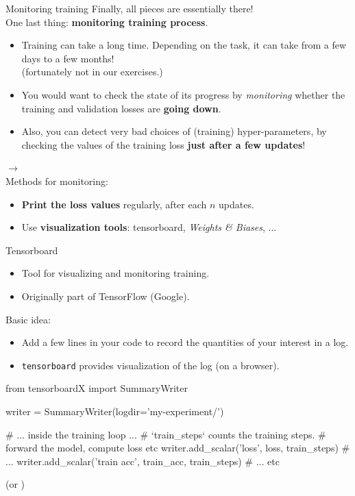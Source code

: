 \begin{frame}[fragile]{Monitoring training}
Finally, all pieces are essentially there!\\
\pause
\vsp
One last thing: \textbf{monitoring training process}.
\pause
\begin{itemize}
\item Training can take a long time. Depending on the task, it can take from a few days to a few months!\\ (fortunately not in our exercises.)
\pause
\item You would want to check the state of its progress by \textit{monitoring}
whether the training and validation losses are \textbf{going down}.
\pause
\item Also, you can detect very bad choices of (training) hyper-parameters, by checking the values of the training loss \textbf{just after a  few updates}!
\end{itemize}
$\rightarrow$ \\
\vsp
\vsp
\pause
Methods for monitoring:
\begin{itemize}
\item \textbf{Print the loss values} regularly, after each $n$ updates.
\item Use \textbf{visualization tools}: tensorboard, \textit{Weights \& Biases}, ...
\end{itemize}
\end{frame}

\begin{frame}[fragile]{Tensorboard}
\vspace{-5mm}
\begin{itemize}
\item Tool for visualizing and monitoring training.
\item Originally part of TensorFlow (Google).
\end{itemize}
\vsp
\pause
Basic idea:
\begin{itemize}
\item Add a few lines in your code to record the quantities of your interest in a log.
\item \texttt{tensorboard} provides visualization of the log (on a browser).
\end{itemize}
\pause
\begin{python}
from tensorboardX import SummaryWriter

writer = SummaryWriter(logdir='my-experiment/')

# ... inside the training loop ...
    # `train_steps` counts the training steps.
    # forward the model, compute loss etc
    writer.add_scalar('loss', loss, train_steps)
    # ...
    writer.add_scalar('train acc', train_acc, train_steps)
    # ... etc
\end{python}
(or )
\end{frame}

